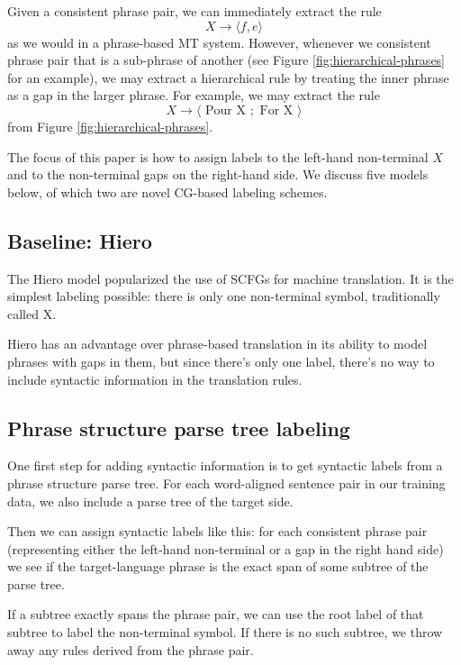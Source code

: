 \documentclass{article}
\begin{document}
Given a consistent phrase pair, we can immediately extract the rule
\begin{equation}
X \to \langle f , e \rangle
\end{equation}
as we would in a phrase-based MT system. However, whenever we consistent phrase pair that is a sub-phrase of another (see Figure \ref{fig:hierarchical-phrases} for an example), we may extract a hierarchical rule by treating the inner phrase as a gap in the larger phrase. For example, we may extract the rule
\begin{equation}
X \to \langle \textrm{ Pour X }; \textrm{ For X } \rangle
\label{eqn:hiero-rule}
\end{equation}
from Figure \ref{fig:hierarchical-phrases}.

The focus of this paper is how to assign labels to the left-hand non-terminal $X$ and to the non-terminal gaps on the right-hand side. We discuss five models below, of which two are novel CG-based labeling schemes.

\subsection{Baseline: Hiero}

The Hiero model \cite{chiang2005} popularized the use of SCFGs for machine translation. It is the simplest labeling possible: there is only one non-terminal symbol, traditionally called X.

Hiero has an advantage over phrase-based translation in its ability to model phrases with gaps in them, but since there's only one label, there's no way to include syntactic information in the translation rules.

\subsection{Phrase structure parse tree labeling}

One first step for adding syntactic information is to get syntactic labels from a phrase structure parse tree. For each word-aligned sentence pair in our training data, we also include a parse tree of the target side.

Then we can assign syntactic labels like this: for each consistent phrase pair (representing either the left-hand non-terminal or a gap in the right hand side) we see if the target-language phrase is the exact span of some subtree of the parse tree.

If a subtree exactly spans the phrase pair, we can use the root label of that subtree to label the non-terminal symbol. If there is no such subtree, we throw away any rules derived from the phrase pair.
\end{document}
